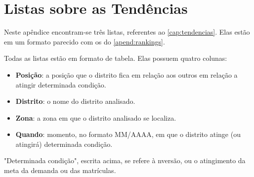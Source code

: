 \chapter{Listas sobre as Tendências}
\label{apend:tendencias}

Neste apêndice encontram-se três listas, referentes ao \autoref{cap:tendencias}. Elas estão em um formato parecido com os do \autoref{apend:rankings}.

Todas as listas estão em formato de tabela. Elas possuem quatro colunas:
 
\begin{itemize}
	\item \textbf{Posição}: a posição que o distrito fica em relação aos outros em relação a atingir determinada condição.
	\item \textbf{Distrito}: o nome do distrito analisado.
	\item \textbf{Zona}: a zona em que o distrito analisado se localiza.
	\item \textbf{Quando}: momento, no formato MM/AAAA, em que o distrito atinge (ou atingirá) determinada condição.
\end{itemize}

"Determinada condição", escrita acima, se refere à nversão, ou o atingimento da meta da demanda ou das matrículas.
